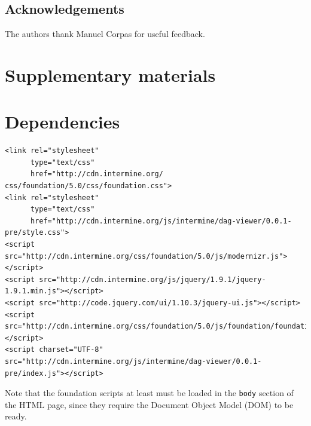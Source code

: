\documentclass[10pt,a4paper,twocolumn]{article}
\begin{document}
\subsection*{Acknowledgements}
The authors thank Manuel Corpas for useful feedback.

\nocite{*}
{\small
}

\clearpage
\section*{Supplementary materials}
\appendix

\section{Dependencies}
\label{sec:deps}

\lstset{language=HTML}
\begin{lstlisting}
<link rel="stylesheet"
      type="text/css"
      href="http://cdn.intermine.org/
css/foundation/5.0/css/foundation.css">
<link rel="stylesheet"
      type="text/css"
      href="http://cdn.intermine.org/js/intermine/dag-viewer/0.0.1-pre/style.css">
<script src="http://cdn.intermine.org/css/foundation/5.0/js/modernizr.js"></script>
<script src="http://cdn.intermine.org/js/jquery/1.9.1/jquery-1.9.1.min.js"></script>
<script src="http://code.jquery.com/ui/1.10.3/jquery-ui.js"></script>
<script src="http://cdn.intermine.org/css/foundation/5.0/js/foundation/foundation.js"></script>
<script charset="UTF-8" src="http://cdn.intermine.org/js/intermine/dag-viewer/0.0.1-pre/index.js"></script>
\end{lstlisting}

Note that the foundation scripts at least must be loaded in the
\texttt{body} section of the HTML page, since they require the
Document Object Model (DOM) to be ready.



\end{document}
